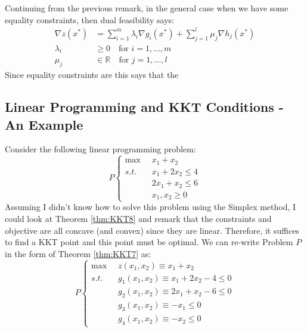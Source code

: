\begin{remark} Continuing from the previous remark, in the general case when we have some equality constraints, then dual feasibility says:
\begin{equation}
\begin{aligned}
\nabla z({x}^*) &= \sum_{i = 1}^m\lambda_i \nabla g_i({x}^*) + \sum_{j = 1}^{l}\mu_j \nabla h_j({x}^*)\\
\lambda_i &\geq 0 \quad \text{for $i=1,\dots,m$}\\
\mu_j &\in \mathbb{R}\quad \text{for $j=1,\dots,l$}
\end{aligned}
\end{equation}
Since equality constraints are  this says that the  
\end{remark}

\subsection{Linear Programming and KKT Conditions - An Example}
Consider the following linear programming problem:
\begin{equation}
P \left \{
\begin{aligned}
\max \;\; & x_1 + x_2  \\ 
s.t. & x_1 + 2x_2 \leq 4\\
& 2x_1 + x_2 \leq 6\\
& x_1, x_2 \geq 0
\end{aligned} \right.
\end{equation}
Assuming I didn't know how to solve this problem using the Simplex method, I could look at Theorem \ref{thm:KKT8} and remark that the constraints and objective are all concave (and convex) since they are linear. Therefore, it suffices to find a KKT point and this point must be optimal.
We can re-write Problem $P$ in the form of Theorem \ref{thm:KKT7} as:
\begin{equation}
P \left \{
\begin{aligned}
\max \;\; & z(x_1,x_2) \equiv x_1 + x_2  \\ 
s.t. & g_1(x_1,x_2) \equiv x_1 + 2x_2 -4 \leq 0\\
& g_2(x_1,x_2) \equiv 2x_1 + x_2 - 6\leq 0\\
& g_3(x_1,x_2) \equiv -x_1 \leq 0\\
& g_4(x_1,x_2) \equiv -x_2 \leq 0
\end{aligned} \right.
\end{equation}

